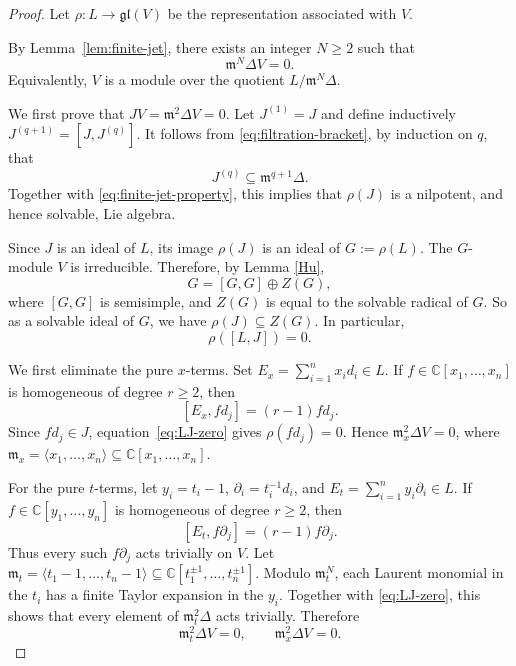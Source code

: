 \documentclass[12pt,a4paper]{amsart}
\numberwithin{equation}{section}
\newcommand{\C}{\mathbb C}
\def\mm{\mathfrak{m}}
\begin{document}
\begin{proof}
Let
\(
\rho\colon L\rightarrow\mathfrak{gl}(V)
\)
be the representation associated with \(V\).

By Lemma~\ref{lem:finite-jet}, there exists an integer \(N\geq2\)
such that
\begin{equation}\label{eq:finite-jet-property}
\mathfrak m^N\Delta V=0.
\end{equation}
Equivalently,  \(V\) is a module over the  quotient $
L/\mathfrak m^N\Delta$.


We first prove that
$
JV=\mathfrak m^2\Delta V=0$.
Let \(J^{(1)}=J\) and define inductively $
J^{(q+1)}=[J,J^{(q)}]$.
It follows from \eqref{eq:filtration-bracket}, by induction on \(q\),
that
\[
J^{(q)}\subseteq\mathfrak m^{q+1}\Delta.
\]
Together with \eqref{eq:finite-jet-property}, this implies that
\(\rho(J)\) is a nilpotent, and hence solvable, Lie algebra.

Since \(J\) is an ideal of \(L\), its image \(\rho(J)\) is an ideal
of $
G:=\rho(L)$.
The \(G\)-module \(V\) is irreducible. Therefore, by Lemma \ref{Hu},
\[
G=[G,G]\oplus Z(G),
\]
where \([G,G]\) is semisimple, and $Z(G)$ is equal to
the solvable radical of $G$. So as a  solvable ideal of $G$, we have
$\rho(J)\subseteq Z(G)$.
In particular,
\begin{equation}\label{eq:LJ-zero}
\rho([L,J])=0.
\end{equation}



We first eliminate the pure \(x\)-terms. Set
$ E_x=\sum_{i=1}^n x_id_i\in L$.
If $f\in\C[x_1,\ldots,x_n]$ is homogeneous of degree \(r\geq2\),
then
\[
[E_x,fd_j]=(r-1)fd_j.
\]
Since \(fd_j\in J\), equation~\eqref{eq:LJ-zero} gives
\(\rho(fd_j)=0\). Hence \(\mathfrak m_x^2\Delta V=0\), where
 $\mm_x
 =
 \langle x_1,\ldots,x_n\rangle
 \subseteq
 \mathbb C[x_1,\ldots,x_n]$.

For the pure \(t\)-terms, let \(y_i=t_i-1\),
\(\partial_i=t_i^{-1}d_i\), and
$E_t=\sum_{i=1}^n y_i\partial_i\in L$.
If \(f\in\C[y_1,\ldots,y_n]\) is homogeneous of degree \(r\geq2\),
then
\[
[E_t,f\partial_j]=(r-1)f\partial_j.
\]
Thus every such \(f\partial_j\) acts trivially on $V$. Let $
\mathfrak m_t
 =
 \langle t_1-1,\ldots,t_n-1\rangle
 \subseteq
 \mathbb C[t_1^{\pm1},\ldots,t_n^{\pm1}]
$. Modulo
\(\mathfrak m_t^N\), each Laurent monomial in the \(t_i\) has a
finite Taylor expansion in the \(y_i\). Together with
\eqref{eq:LJ-zero}, this shows that every element of
\(\mathfrak m_t^2\Delta\) acts trivially. Therefore
\begin{equation}\label{eq:pure-terms-zero}
\mathfrak m_t^2\Delta V=0,
\qquad
\mathfrak m_x^2\Delta V=0.
\end{equation}


\end{proof}
\end{document}
